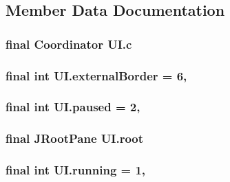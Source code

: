 \subsection{Member Data Documentation}
\hypertarget{classUI_ae995cfefdd6a9abe14d92da9eb82a0e5}{
\subsubsection[{c}]{\setlength{\rightskip}{0pt plus 5cm}final {\bf Coordinator} U\-I.\-c\hspace{0.3cm}{\ttfamily [private]}}}\label{classUI_ae995cfefdd6a9abe14d92da9eb82a0e5}
\hypertarget{classUI_afb0f2cb14286204c475dc199d4ed79ba}{
\subsubsection[{external\-Border}]{\setlength{\rightskip}{0pt plus 5cm}final int U\-I.\-external\-Border = 6\hspace{0.3cm}{\ttfamily [static]}, {\ttfamily [private]}}}\label{classUI_afb0f2cb14286204c475dc199d4ed79ba}
\hypertarget{classUI_ade79dbf5da2369fd6a7f4862d9e8a41f}{
\subsubsection[{paused}]{\setlength{\rightskip}{0pt plus 5cm}final int U\-I.\-paused = 2\hspace{0.3cm}{\ttfamily [static]}, {\ttfamily [private]}}}\label{classUI_ade79dbf5da2369fd6a7f4862d9e8a41f}
\hypertarget{classUI_a9164dec043cc2849bad9e01de7919ce8}{
\subsubsection[{root}]{\setlength{\rightskip}{0pt plus 5cm}final J\-Root\-Pane U\-I.\-root\hspace{0.3cm}{\ttfamily [private]}}}\label{classUI_a9164dec043cc2849bad9e01de7919ce8}
\hypertarget{classUI_af5e146150e3739db87e209d6d77a5199}{
\subsubsection[{running}]{\setlength{\rightskip}{0pt plus 5cm}final int U\-I.\-running = 1\hspace{0.3cm}{\ttfamily [static]}, {\ttfamily [private]}}}\label{classUI_af5e146150e3739db87e209d6d77a5199}

